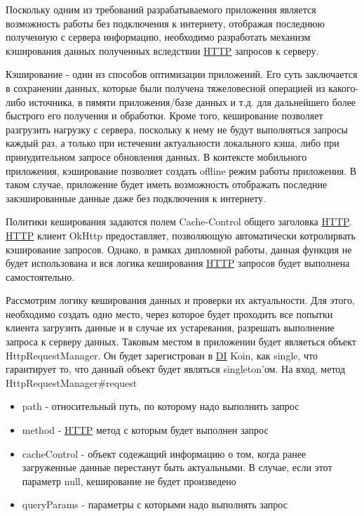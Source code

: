 Поскольку одним из требований разрабатываемого приложения является возможность работы без подключения к интернету, отображая последнюю полученную с сервера информацию, необходимо разработать механизм кэширования данных полученных вследствии \hyperlink{gloss:http}{HTTP} запросов к серверу.

Кэширование - один из способов оптимизации приложений.
Его суть заключается в сохранении данных, которые были получена тяжеловесной операцией из какого-либо источника, в пямяти приложения/базе данных и т.д. для дальнейшего более быстрого его получения и обработки.
Кроме того, кеширование позволяет разгрузить нагрузку с сервера, поскольку к нему не будут выполняться запросы каждый раз, а только при истечении актуальности локального кэша, либо при принудительном запросе обновления данных.
В контексте мобильного приложения, кэширование позволяет создать offline режим работы приложения.
В таком случае, приложение будет иметь возможность отображать последние закэшированные данные даже без подключения к интернету.

Политики кеширования задаются полем Cache-Control общего заголовка \hyperlink{gloss:http}{HTTP}. \hyperlink{gloss:http}{HTTP} клиент OkHttp предоставляет, позволяющую автоматически котролирвать кэширование запросов.
Однако, в рамках дипломной работы, данная функция не будет использована и вся логика кеширования \hyperlink{gloss:http}{HTTP} запросов будет выполнена самостоятельно.

Рассмотрим логику кеширования данных и проверки их актуальности.
Для этого, необходимо создать одно место, через которое будет проходить все попытки клиента загрузить данные и в случае их устаревания, разрешать выполнение запроса к серверу данных.
Таковым местом в приложении будет являеться объект HttpRequestManager.
Он будет зарегистрован в \hyperlink{gloss:di}{DI} Koin, как single, что гарантирует то, что данный объект будет являться singleton'ом.
На вход, метод HttpRequestManager\#request
\begin{itemize}
    \item path - относительный путь, по которому надо выполнить запрос
    \item method - \hyperlink{gloss:http}{HTTP} метод с которым будет выполнен запрос
    \item cacheControl - объект содежащий информацию о том, когда ранее загруженные данные перестанут быть актуальными.
    В случае, если этот параметр null, кеширование не будет произведено
    \item queryParams - параметры с которыми надо выполнять запрос
\end{itemize}

